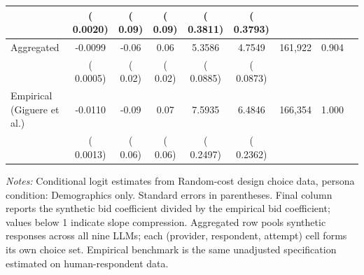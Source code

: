 \begin{table}[h]
\begin{threeparttable}
\begin{tabular}{lcccccccr}
 & (   0.0020) & (     0.09) & (     0.09) & (   0.3811) & (   0.3793) & & \\
\midrule
Aggregated &   -0.0099 &     -0.06 &      0.06 &    5.3586 &    4.7549 &   161,922 &  0.904 \\
 & (   0.0005) & (     0.02) & (     0.02) & (   0.0885) & (   0.0873) & & \\
\midrule
Empirical (Giguere et al.) &   -0.0110 &     -0.09 &      0.07 &    7.5935 &    6.4846 &   166,354 & 1.000 \\
 & (   0.0013) & (     0.06) & (     0.06) & (   0.2497) & (   0.2362) & & \\
\bottomrule
\end{tabular}
\begin{tablenotes}\footnotesize
\item \textit{Notes:} Conditional logit estimates from Random-cost design choice data, persona condition: Demographics only. 
Standard errors in parentheses. 
Final column reports the synthetic bid coefficient divided by the empirical bid coefficient; values below 1 indicate slope compression. 
Aggregated row pools synthetic responses across all nine LLMs; each (provider, respondent, attempt) cell forms its own choice set. 
Empirical benchmark is the same unadjusted specification estimated on \textcite{Giguere2020} human-respondent data.
\end{tablenotes}
\end{threeparttable}
\end{table}
